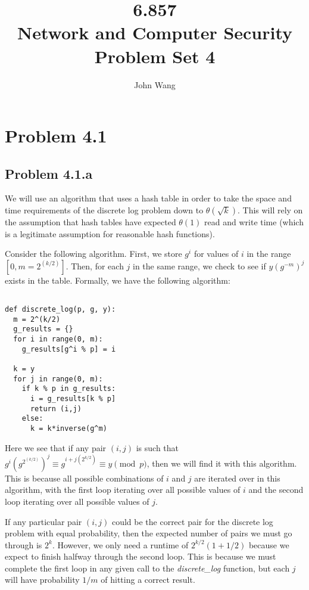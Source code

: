 \documentclass[psamsfonts]{amsart}
\title{6.857 \\
Network and Computer Security \\
Problem Set 4}
\author{John Wang}
\begin{document}
\maketitle

\section*{Problem 4.1}

\subsection*{Problem 4.1.a}

We will use an algorithm that uses a hash table in order to take the space and time requirements of the discrete log problem down to $\theta(\sqrt{k})$. This will rely on the assumption that hash tables have expected $\theta(1)$ read and write time (which is a legitimate assumption for reasonable hash functions).

Consider the following algorithm. First, we store $g^i$ for values of $i$ in the range $[0, m = 2^(k/2)]$. Then, for each $j$ in the same range, we check to see if $y (g^{-m})^j$ exists in the table. Formally, we have the following algorithm:

\begin{verbatim}

def discrete_log(p, g, y):
  m = 2^(k/2)
  g_results = {}
  for i in range(0, m):
    g_results[g^i % p] = i

  k = y
  for j in range(0, m):
    if k % p in g_results:
      i = g_results[k % p]
      return (i,j)
    else:
      k = k*inverse(g^m)
\end{verbatim}

Here we see that if any pair $(i,j)$ is such that $g^i (g^{2^(k/2)})^j \equiv g^{i + j (2^{k/2})} \equiv y \pmod{p}$, then we will find it with this algorithm. This is because all possible combinations of $i$ and $j$ are iterated over in this algorithm, with the first loop iterating over all possible values of $i$ and the second loop iterating over all possible values of $j$.

If any particular pair $(i,j)$ could be the correct pair for the discrete log problem with equal probability, then the expected number of pairs we must go through is $2^k$. However, we only need a runtime of $2^{k/2} (1 + 1/2)$ because we expect to finish halfway through the second loop. This is because we must complete the first loop in any given call to the \emph{discrete\_log} function, but each $j$ will have probability $1/m$ of hitting a correct result.
\end{document}
